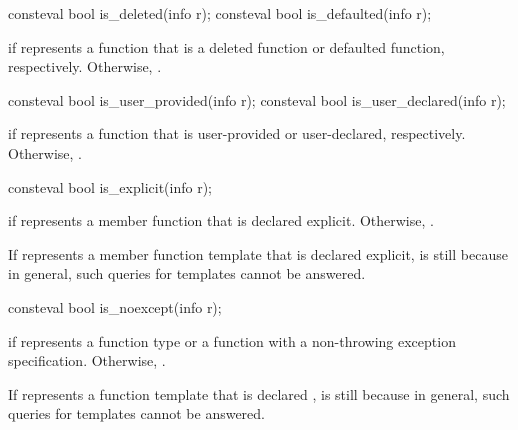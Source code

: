 %
%
\begin{itemdecl}
consteval bool is_deleted(info r);
consteval bool is_defaulted(info r);
\end{itemdecl}

\begin{itemdescr}
\pnum
\returns
{} if  represents a function that is
a deleted function
or defaulted function, respectively.
Otherwise, .
\end{itemdescr}

%
%
\begin{itemdecl}
consteval bool is_user_provided(info r);
consteval bool is_user_declared(info r);
\end{itemdecl}

\begin{itemdescr}
\pnum
\returns
{} if  represents a function that is
user-provided or user-declared, respectively.
Otherwise, .
\end{itemdescr}

%
\begin{itemdecl}
consteval bool is_explicit(info r);
\end{itemdecl}

\begin{itemdescr}
\pnum
\returns
{} if  represents a member function that is declared explicit.
Otherwise, .
\begin{note}
If  represents a member function template that is declared explicit,
 is still 
because in general,
such queries for templates cannot be answered.
\end{note}
\end{itemdescr}

%
\begin{itemdecl}
consteval bool is_noexcept(info r);
\end{itemdecl}

\begin{itemdescr}
\pnum
\returns
{} if  represents a  function type
or a function with a non-throwing exception specification.
Otherwise, .
\begin{note}
If  represents a function template that is declared ,
 is still 
because in general,
such queries for templates cannot be answered.
\end{note}
\end{itemdescr}

